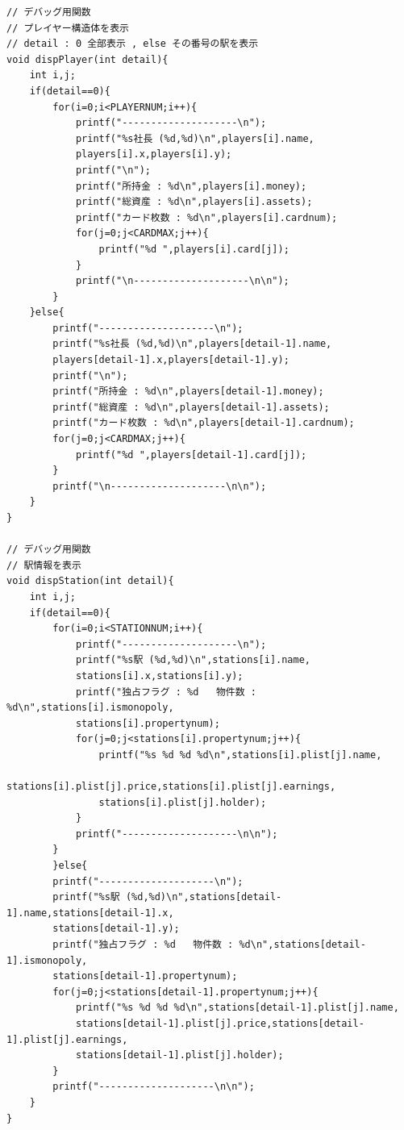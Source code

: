 \documentclass[a4j]{jarticle}
\begin{document}
    \begin{lstlisting}[basicstyle=\ttfamily\footnotesize, frame=single,label=debugfunc,caption=構造体の初期化を確認するための関数]
// デバッグ用関数 	
// プレイヤー構造体を表示	
// detail : 0 全部表示 , else その番号の駅を表示	
void dispPlayer(int detail){	
    int i,j;	
    if(detail==0){	
        for(i=0;i<PLAYERNUM;i++){	
            printf("--------------------\n");	
            printf("%s社長 (%d,%d)\n",players[i].name,
            players[i].x,players[i].y);	
            printf("\n");	
            printf("所持金 : %d\n",players[i].money);	
            printf("総資産 : %d\n",players[i].assets);
            printf("カード枚数 : %d\n",players[i].cardnum);
            for(j=0;j<CARDMAX;j++){
                printf("%d ",players[i].card[j]);
            }	
            printf("\n--------------------\n\n");	
        }	
    }else{	
        printf("--------------------\n");	
        printf("%s社長 (%d,%d)\n",players[detail-1].name,
        players[detail-1].x,players[detail-1].y);	
        printf("\n");	
        printf("所持金 : %d\n",players[detail-1].money);	
        printf("総資産 : %d\n",players[detail-1].assets);
        printf("カード枚数 : %d\n",players[detail-1].cardnum);
        for(j=0;j<CARDMAX;j++){
            printf("%d ",players[detail-1].card[j]);
        }		
        printf("\n--------------------\n\n");   	
    }	
}

// デバッグ用関数	
// 駅情報を表示	
void dispStation(int detail){	
    int i,j;	
    if(detail==0){	
        for(i=0;i<STATIONNUM;i++){	
            printf("--------------------\n");	
            printf("%s駅 (%d,%d)\n",stations[i].name,
            stations[i].x,stations[i].y);	
            printf("独占フラグ : %d   物件数 : %d\n",stations[i].ismonopoly,
            stations[i].propertynum);	
            for(j=0;j<stations[i].propertynum;j++){	
                printf("%s %d %d %d\n",stations[i].plist[j].name,
                stations[i].plist[j].price,stations[i].plist[j].earnings,
                stations[i].plist[j].holder);	
            }	
            printf("--------------------\n\n");	
        }	
        }else{	
        printf("--------------------\n");	
        printf("%s駅 (%d,%d)\n",stations[detail-1].name,stations[detail-1].x,
        stations[detail-1].y);	
        printf("独占フラグ : %d   物件数 : %d\n",stations[detail-1].ismonopoly,
        stations[detail-1].propertynum);	
        for(j=0;j<stations[detail-1].propertynum;j++){	
            printf("%s %d %d %d\n",stations[detail-1].plist[j].name,
            stations[detail-1].plist[j].price,stations[detail-1].plist[j].earnings,
            stations[detail-1].plist[j].holder);	
        }	
        printf("--------------------\n\n");     	
    }	
}
\end{lstlisting}
\end{document}
